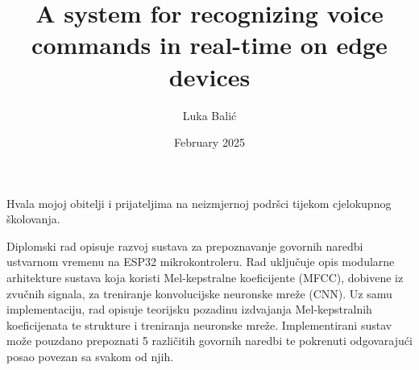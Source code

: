 \documentclass[diplomskirad, upload]{fer}
\title{A system for recognizing voice commands in real-time on edge devices}
\author{Luka Balić}
\date{February 2025}
\begin{document}
\maketitle






\begin{zahvale}
  Hvala mojoj obitelji i prijateljima na neizmjernoj podršci tijekom cjelokupnog školovanja.
\end{zahvale}


\mainmatter


\tableofcontents

%








\begingroup
\small

\endgroup



\begin{sazetak}
  Diplomski rad opisuje razvoj sustava za prepoznavanje govornih naredbi
  ustvarnom vremenu na ESP32 mikrokontroleru. Rad uključuje opis modularne
  arhitekture sustava koja koristi Mel-kepstralne koeficijente (MFCC),
  dobivene iz zvučnih signala, za treniranje konvolucijske
  neuronske mreže (CNN). Uz samu implementaciju, rad opisuje teorijsku
  pozadinu izdvajanja Mel-kepstralnih koeficijenata te strukture i
  treniranja neuronske mreže. Implementirani sustav može pouzdano
  prepoznati 5 različitih govornih naredbi te pokrenuti odgovarajući
  posao povezan sa svakom od njih.
\end{sazetak}
\end{document}

